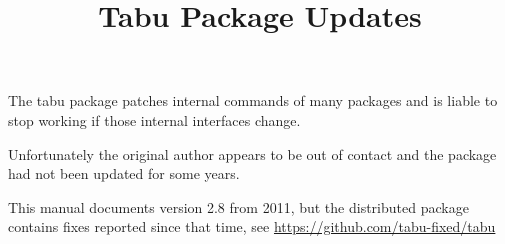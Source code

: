 \documentclass[a4paper]{article}
\begin{document}
\title{Tabu Package Updates}
\maketitle

The tabu package patches internal commands of many packages and is
liable to stop working if those internal interfaces change. 

Unfortunately the original author appears to be out of contact and the
package had not been updated for some years.

This manual documents version 2.8 from 2011, but the distributed
package contains fixes reported since that time, see
\url{https://github.com/tabu-fixed/tabu}
\end{document}
